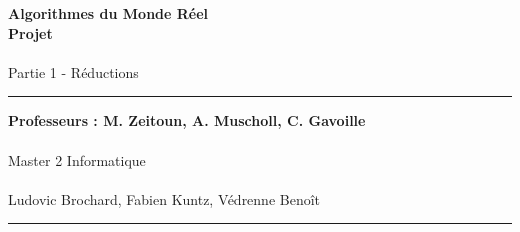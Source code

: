 \documentclass[a4paper]{article}
\newlength{\larg}
\begin{document}
\thispagestyle{empty}

\setlength{\unitlength}{1in}


\begin{flushright}
 \noindent {\rule{\larg}{0.5mm}}
\end{flushright}
\vspace{7mm}
\begin{flushright}
 \Huge{\bf Algorithmes du Monde Réel} \\
 \Huge{\bf Projet} \\
 ~\\
 \huge{Partie 1 - Réductions}\\
\end{flushright}
\vspace{7mm}
\begin{flushright}
 {\rule{\larg}{0.5mm}}
\end{flushright}
\vspace{2mm}
\begin{flushright}
 \large{\bf Professeurs : M. Zeitoun, A. Muscholl, C. Gavoille} \\
 ~\\
 \large{Master 2 Informatique}\\
 ~\\
 \vspace{10cm}
 \large{Ludovic Brochard, Fabien Kuntz, Védrenne Benoît}
{\rule{\larg}{0.5mm}}
\end{flushright}

\newpage

\addtolength{\oddsidemargin}{1cm}

\thispagestyle{empty}
\tableofcontents
\newpage

\setcounter{page}{1}









\end{document}
